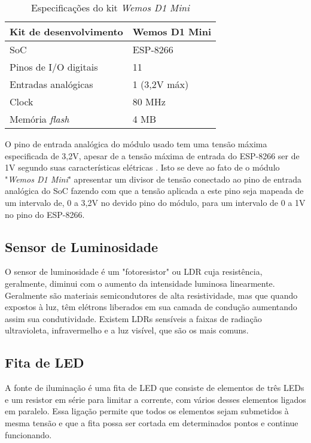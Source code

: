 
\begin{table}
    \centering
    \label{wemos_dados}
    \caption{Especificações do kit \textit{Wemos D1 Mini}}
    \begin{tabular}{ll} 
        \hline
        Kit de desenvolvimento          & Wemos D1 Mini  \\ 
        \hline
        SoC                             & ESP-8266       \\ 
        \hline
        Pinos de I/O digitais           & 11             \\ 
        \hline
        Entradas analógicas             & 1 (3,2V máx)   \\ 
        \hline
        Clock                           & 80 MHz         \\ 
        \hline
        Memória \textit{flash}          & 4 MB           \\
        \hline
    \end{tabular}
\end{table}

O pino de entrada analógica do módulo usado tem uma tensão máxima especificada de 3,2V, apesar de a tensão máxima de entrada do ESP-8266 ser de 1V segundo suas características elétricas \cite{esp}. Isto se deve ao fato de o módulo "\textit{Wemos D1 Mini}" apresentar um divisor de tensão conectado ao pino de entrada analógica do SoC fazendo com que a tensão aplicada a este pino seja mapeada de um intervalo de, 0 a 3,2V no devido pino do módulo, para um intervalo de 0 a 1V no pino do ESP-8266.

\subsection{Sensor de Luminosidade}

O sensor de luminosidade %
é um "fotoresistor" ou \acf{LDR} cuja resistência, geralmente, diminui com o aumento da intensidade luminosa linearmente. Geralmente são materiais semicondutores de alta resistividade, mas que quando expostos à luz, têm elétrons liberados em sua camada de condução aumentando assim sua condutividade. Existem LDRs sensíveis a faixas de radiação ultravioleta, infravermelho e a luz visível, que são os mais comuns.



\subsection{Fita de LED}
A fonte de iluminação é uma fita de LED que consiste de elementos de três LEDs e um resistor em série para limitar a corrente, com vários desses elementos ligados em paralelo. Essa ligação permite que todos os elementos sejam submetidos à mesma tensão e que a fita possa ser cortada em determinados pontos e continue funcionando.

